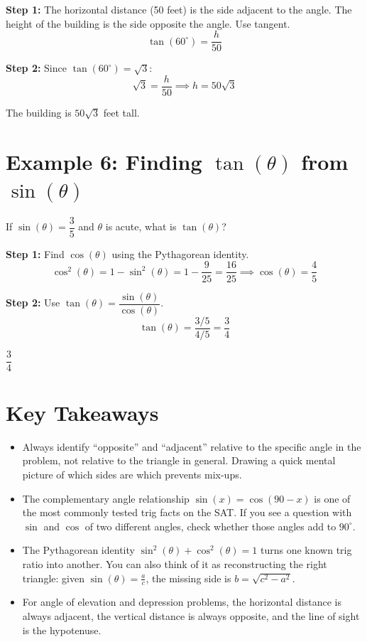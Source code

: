 \documentclass[14pt]{extarticle}
\begin{document}
\textbf{Step 1:} The horizontal distance (50 feet) is the side adjacent to the angle. The height of the building is the side opposite the angle. Use tangent.
\[
\tan(60^\circ) = \frac{h}{50}
\]

\textbf{Step 2:} Since \(\tan(60^\circ) = \sqrt{3}\):
\[
\sqrt{3} = \frac{h}{50} \implies h = 50\sqrt{3}
\]

The building is \(\boxed{50\sqrt{3}}\) feet tall.

\section*{Example 6: Finding \(\tan(\theta)\) from \(\sin(\theta)\)}

If \(\sin(\theta) = \dfrac{3}{5}\) and \(\theta\) is acute, what is \(\tan(\theta)\)?

\textbf{Step 1:} Find \(\cos(\theta)\) using the Pythagorean identity.
\[
\cos^2(\theta) = 1 - \sin^2(\theta) = 1 - \frac{9}{25} = \frac{16}{25} \implies \cos(\theta) = \frac{4}{5}
\]

\textbf{Step 2:} Use \(\tan(\theta) = \dfrac{\sin(\theta)}{\cos(\theta)}\).
\[
\tan(\theta) = \frac{3/5}{4/5} = \frac{3}{4}
\]

\(\boxed{\dfrac{3}{4}}\)

\section*{Key Takeaways}
\begin{itemize}
  \item Always identify ``opposite'' and ``adjacent'' relative to the specific angle in the problem, not relative to the triangle in general. Drawing a quick mental picture of which sides are which prevents mix-ups.
  \item The complementary angle relationship \(\sin(x) = \cos(90 - x)\) is one of the most commonly tested trig facts on the SAT. If you see a question with \(\sin\) and \(\cos\) of two different angles, check whether those angles add to \(90^\circ\).
  \item The Pythagorean identity \(\sin^2(\theta) + \cos^2(\theta) = 1\) turns one known trig ratio into another. You can also think of it as reconstructing the right triangle: given \(\sin(\theta) = \frac{a}{c}\), the missing side is \(b = \sqrt{c^2 - a^2}\).
  \item For angle of elevation and depression problems, the horizontal distance is always adjacent, the vertical distance is always opposite, and the line of sight is the hypotenuse.
\end{itemize}
\end{document}
